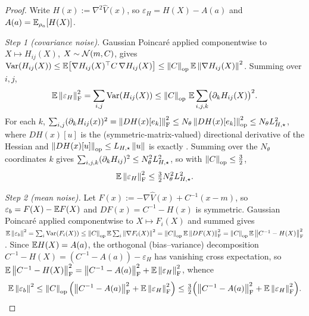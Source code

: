 \begin{proof}
Write $H(x):=\nabla^2\widehat V(x)$, so $\varepsilon_H=H(X)-A(a)$ and $A(a)=\mathbb{E}_{\rho_a}[H(X)]$.

\emph{Step 1 (covariance noise).} Gaussian Poincar\'e applied componentwise to $X\mapsto H_{ij}(X)$,
$X\sim\mathcal{N}(m,C)$, gives $\operatorname{Var}(H_{ij}(X))\leq\mathbb{E}\bigl[\nabla H_{ij}(X)^\top C\,\nabla H_{ij}(X)\bigr]\leq\left\lVert C\right\rVert_{\mathrm{op}}\mathbb{E}\left\lVert \nabla H_{ij}(X)\right\rVert^2$.
Summing over $i,j$,
\[
    \mathbb{E}\left\lVert \varepsilon_H\right\rVert_{\mathrm{F}}^2=\sum_{i,j}\operatorname{Var}(H_{ij}(X))
    \leq\left\lVert C\right\rVert_{\mathrm{op}}\,\mathbb{E}\sum_{i,j,k}\bigl(\partial_kH_{ij}(X)\bigr)^2 .
\]
For each $k$, $\sum_{i,j}(\partial_kH_{ij}(x))^2=\left\lVert DH(x)[e_k]\right\rVert_{\mathrm{F}}^2\leq N_\theta\left\lVert DH(x)[e_k]\right\rVert_{\mathrm{op}}^2\leq N_\theta L_{H,\star}^2$,
where $DH(x)[u]$ is the (symmetric-matrix-valued) directional derivative of the Hessian and
$\left\lVert DH(x)[u]\right\rVert_{\mathrm{op}}\leq L_{H,\star}\left\lVert u\right\rVert$ is exactly . Summing over the
$N_\theta$ coordinates $k$ gives $\sum_{i,j,k}(\partial_kH_{ij})^2\leq N_\theta^2L_{H,\star}^2$, so with
$\left\lVert C\right\rVert_{\mathrm{op}}\leq\tfrac32$,
\begin{equation}
\label{eq:covnoise}
    \mathbb{E}\left\lVert \varepsilon_H\right\rVert_{\mathrm{F}}^2\leq\tfrac32N_\theta^2L_{H,\star}^2 .
\end{equation}

\emph{Step 2 (mean noise).} Let $F(x):=-\nabla\widehat V(x)+C^{-1}(x-m)$, so $\varepsilon_b=F(X)-\mathbb{E} F(X)$
and $DF(x)=C^{-1}-H(x)$ is symmetric. Gaussian Poincar\'e applied componentwise to $X\mapsto F_i(X)$
and summed gives
$\mathbb{E}\left\lVert \varepsilon_b\right\rVert^2=\sum_i\operatorname{Var}(F_i(X))\leq\left\lVert C\right\rVert_{\mathrm{op}}\mathbb{E}\sum_i\left\lVert \nabla F_i(X)\right\rVert^2=\left\lVert C\right\rVert_{\mathrm{op}}\mathbb{E}\left\lVert DF(X)\right\rVert_{\mathrm{F}}^2=\left\lVert C\right\rVert_{\mathrm{op}}\mathbb{E}\left\lVert C^{-1}-H(X)\right\rVert_{\mathrm{F}}^2$.
Since $\mathbb{E} H(X)=A(a)$, the orthogonal (bias--variance) decomposition
$C^{-1}-H(X)=(C^{-1}-A(a))-\varepsilon_H$ has vanishing cross expectation, so
$\mathbb{E}\left\lVert C^{-1}-H(X)\right\rVert_{\mathrm{F}}^2=\left\lVert C^{-1}-A(a)\right\rVert_{\mathrm{F}}^2+\mathbb{E}\left\lVert \varepsilon_H\right\rVert_{\mathrm{F}}^2$, whence
\begin{equation}
\label{eq:meannoise}
    \mathbb{E}\left\lVert \varepsilon_b\right\rVert^2\leq\left\lVert C\right\rVert_{\mathrm{op}}\Bigl(\left\lVert C^{-1}-A(a)\right\rVert_{\mathrm{F}}^2+\mathbb{E}\left\lVert \varepsilon_H\right\rVert_{\mathrm{F}}^2\Bigr)
    \leq\tfrac32\Bigl(\left\lVert C^{-1}-A(a)\right\rVert_{\mathrm{F}}^2+\mathbb{E}\left\lVert \varepsilon_H\right\rVert_{\mathrm{F}}^2\Bigr).
\end{equation}


\end{proof}
